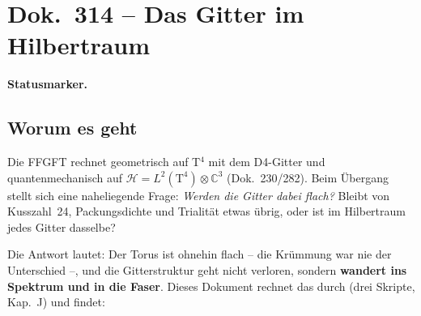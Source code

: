 \maketitle
\tableofcontents

\chapter*{Dok.~314 -- Das Gitter im Hilbertraum}

\medskip\noindent\textbf{Statusmarker.}


\section*{Worum es geht}

Die FFGFT rechnet geometrisch auf T$^4$ mit dem D4-Gitter und
quantenmechanisch auf $\mathcal{H} = L^2(\text{T}^4)\otimes
\mathbb{C}^3$ (Dok.~230/282). Beim Übergang stellt sich eine
naheliegende Frage: \emph{Werden die Gitter dabei flach?} Bleibt von
Kusszahl~24, Packungsdichte und Trialität etwas übrig, oder ist im
Hilbertraum jedes Gitter dasselbe?

Die Antwort lautet: Der Torus ist ohnehin flach -- die Krümmung war
nie der Unterschied --, und die Gitterstruktur geht nicht verloren,
sondern \textbf{wandert ins Spektrum und in die Faser}. Dieses
Dokument rechnet das durch (drei Skripte, Kap.~J) und findet:

